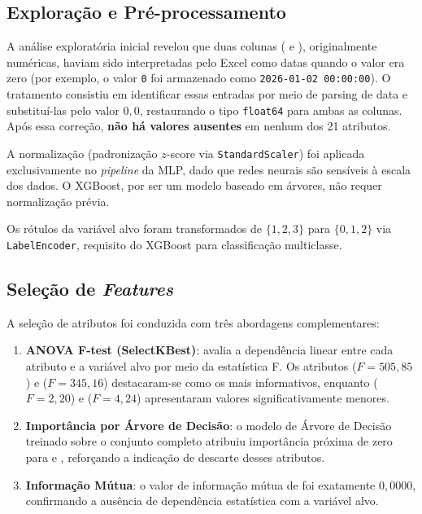 \documentclass[12pt, a4paper]{article}
\begin{document}
\subsection{Exploração e Pré-processamento}

A análise exploratória inicial revelou que duas colunas (
e ), originalmente numéricas, haviam sido
interpretadas pelo Excel como datas quando o valor era zero (por exemplo, o valor \texttt{0}
foi armazenado como \texttt{2026-01-02 00:00:00}). O tratamento consistiu em identificar essas
entradas por meio de parsing de data e substituí-las pelo valor $0{,}0$, restaurando o tipo
\texttt{float64} para ambas as colunas. Após essa correção, \textbf{não há valores ausentes} em
nenhum dos 21 atributos.

A normalização (padronização $z$-score via \texttt{StandardScaler}) foi aplicada exclusivamente
no \textit{pipeline} da MLP, dado que redes neurais são sensíveis à escala dos dados. O XGBoost,
por ser um modelo baseado em árvores, não requer normalização prévia.

Os rótulos da variável alvo foram transformados de $\{1, 2, 3\}$ para $\{0, 1, 2\}$ via
\texttt{LabelEncoder}, requisito do XGBoost para classificação multiclasse.

\subsection{Seleção de \textit{Features}}

A seleção de atributos foi conduzida com três abordagens complementares:

\begin{enumerate}
    \item \textbf{ANOVA F-test (SelectKBest)}: avalia a dependência linear entre cada atributo
    e a variável alvo por meio da estatística F. Os atributos 
    ($F = 505{,}85$) e 
    ($F = 345{,}16$) destacaram-se como os mais informativos, enquanto
     ($F = 2{,}20$) e
     ($F = 4{,}24$) apresentaram valores
    significativamente menores.

    \item \textbf{Importância por Árvore de Decisão}: o modelo de Árvore de Decisão treinado
    sobre o conjunto completo atribuiu importância próxima de zero para
     e , reforçando a indicação de
    descarte desses atributos.

    \item \textbf{Informação Mútua}: o valor de informação mútua de
     foi exatamente $0{,}0000$, confirmando a
    ausência de dependência estatística com a variável alvo.
\end{enumerate}
\end{document}

